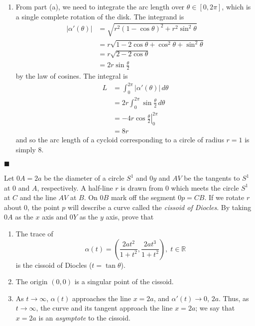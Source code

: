 \documentclass[12pt]{article}
\renewcommand{\qed}{\hfill$\blacksquare$}
\renewenvironment{proof}{\begin{addmargin}[1em]{0em}\begin{newproof}}{\end{newproof}\end{addmargin}\qed}
\newenvironment{problem}[2][Exercise]{\begin{trivlist}
\item[\hskip \labelsep {\bfseries #1}\hskip \labelsep {\bfseries #2.}]}{\end{trivlist}}
\begin{document}
\begin{proof}
\begin{enumerate}[label=(\alph*)]
\item From part (a), we need to integrate the arc length over $\theta \in \left[0,2\pi\right]$, which is a single complete rotation of the disk. The integrand is 
\begin{align*}
\left| \alpha'\left(\theta\right)\right| & = \sqrt{r^2\left(1-\cos\theta\right)^2 + r^2\sin^2\theta }   \\
& = r \sqrt{1 -2\cos \theta + \cos^2\theta + \sin^2 \theta } \\
& = r\sqrt{2-2\cos\theta} \\
& = 2r \sin \frac{\theta}{2} 
\end{align*}
by the law of cosines. The integral is
\begin{align*}
L & = \int_{0}^{2\pi} \left| \alpha'\left(\theta\right)\right|\, d\theta \\
& = 2r \int_{0}^{2\pi} \sin \frac{\theta}{2} \, d\theta \\
& = -4r \cos \left. \frac{\theta}{2} \right|_{0}^{2\pi} \\
& = 8r
\end{align*}
and so the arc length of a cycloid corresponding to a circle of radius $r=1$ is simply $8$.
\end{enumerate}
\end{proof}







\begin{problem}{1.3.3}
Let $0A=2a$ be the diameter of a circle $S^1$ and $0y$ and $AV$ be the tangents to $S^1$ at $0$ and $A$, respectively. A half-line $r$ is drawn from $0$ which meets the circle $S^1$ at $C$ and the line $AV$ at $B$. On $0B$ mark off the segment $0p=CB$. If we rotate $r$ about $0$, the point $p$ will describe a curve called the \textit{cissoid of Diocles}. By taking $0A$ as the $x$ axis and $0Y$ as the $y$ axis, prove that
\begin{enumerate}[label=(\alph*)]
	\item The trace of \[ \alpha\left( t \right) = \left( \frac{2at^2}{1+t^2}, \frac{2at^3}{1+t^2} \right) , \; t\in \mathbb{R} \] is the cissoid of Diocles ($t=\tan \theta $).
	\item The origin $\left(0,0\right)$ is a singular point of the cissoid.
	\item As $t\rightarrow \infty$, $\alpha\left(t\right)$ approaches the line $x=2a$, and $\alpha'\left(t\right)\rightarrow 0$, $2a$. Thus, as $t\rightarrow \infty$, the curve and its tangent approach the line $x=2a$; we say that $x=2a$ is an \textit{asymptote} to the cissoid.
\end{enumerate}
\end{problem}
\end{document}
